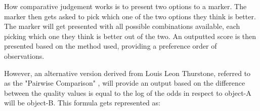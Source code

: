 	
		
		
		

	How comparative judgement works is to present two options to a marker. The marker then gets asked to pick which one of the two options they think is better. The marker will get presented with all possible combinations available, each picking which one they think is better out of the two. An outputted score is then presented based on the method used, providing a preference order of observations. 
	
	However, an alternative version derived from Louis Leon Thurstone, referred to as the "Pairwise Comparison" \cite{thurstone1927law}, will provide an output based on the difference between the quality values is equal to the log of the odds in respect to object-A will be object-B. This formula gets represented as:
	
